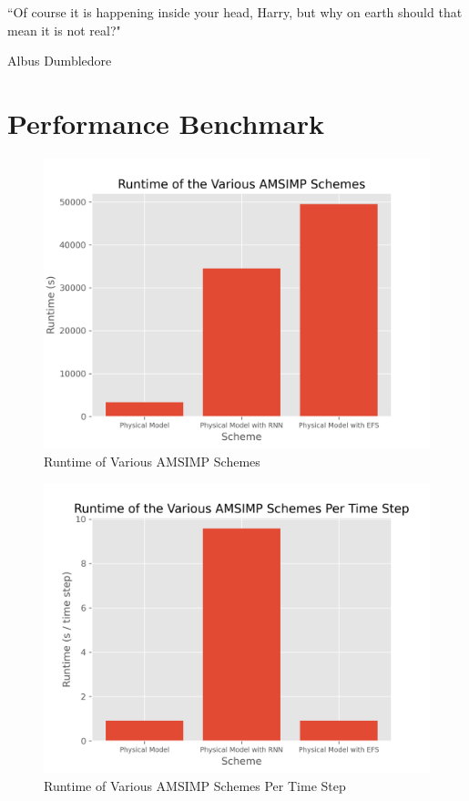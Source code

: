 \epigraph{``Of course it is happening inside your head, Harry, but why on earth should that mean it is not real?"}{Albus Dumbledore}

\section{Performance Benchmark}
\begin{figure}[H]
    \centering
    \includegraphics[width=.8\linewidth]{Graphs/performance/runtime.png}
    \caption{Runtime of Various AMSIMP Schemes}
\end{figure}

\begin{figure}[H]
    \centering
    \includegraphics[width=.8\linewidth]{Graphs/performance/runtime_per_timestep.png}
    \caption{Runtime of Various AMSIMP Schemes Per Time Step}
\end{figure}


